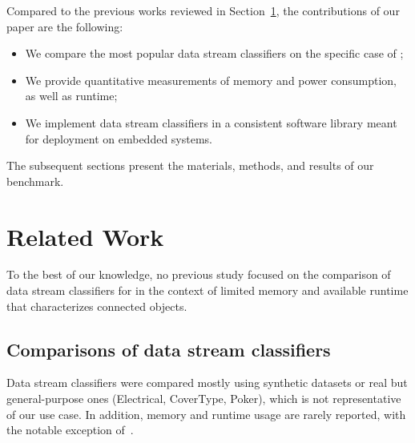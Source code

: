 Compared to the previous works reviewed in Section~\ref{sec:related-work}, the contributions of our paper are the following:
\begin{itemize}
    \item We compare the most popular data stream classifiers on the specific case of \har;
    \item We provide quantitative measurements of memory and power consumption, as well as runtime;
    \item We implement data stream classifiers in a consistent software library meant for deployment on embedded systems.
\end{itemize} 
The subsequent sections present the materials, methods, and results of our benchmark.


\section{Related Work}

\label{sec:related-work}

To the best of our knowledge, no previous study focused on the comparison
of data stream classifiers for \har in the context of limited memory and
available runtime that characterizes connected objects.

\subsection{Comparisons of data stream classifiers}

Data stream classifiers were compared mostly using synthetic datasets or real
but general-purpose ones (Electrical, CoverType, Poker), which is not
representative of our use case. 
In addition, memory and runtime usage are rarely
reported, with the notable exception of~\cite{StreamDM-CPP}.

